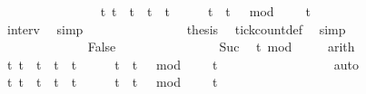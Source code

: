\begin{isabellebody}
\ \ \ \ \ \ \ \ \ \ \ \ \ \ \isamarkupfalse%
\ {\isacartoucheopen}{\isacharbraceleft}t{\isachardot}\ t\ {\isasymle}\ t\ {\isasymand}\ t\ {\isacharless}\ t\ {\isacharplus}\ {}\ {\isasymand}\ {}\ {\isasymle}\ t\ {\isasymand}\ {\isacharparenleft}t\ {\isacharminus}\ {}{\isacharparenright}\ mod\ {}\ {\isacharequal}\ {}{\isacharbraceright}\ {\isacharequal}\ {\isacharbraceleft}t\isanewline
\ \ \ \ \ \ \ \ \ \ \ \ \ \ \ \ \isamarkupfalse%
\ interv{\isacharunderscore}{}\ \isamarkupfalse%
\ simp\isanewline
\ \ \ \ \ \ \ \ \ \ \ \ \ \ \isamarkupfalse%
\ {\isacharquery}thesis\ \isamarkupfalse%
\ tick{\isacharunderscore}count{\isacharunderscore}def\ \isamarkupfalse%
\ simp\isanewline
\ \ \ \ \ \ \ \ \ \ \isamarkupfalse%
\isanewline
\ \ \ \ \ \ \ \ \ \ \ \ \isamarkupfalse%
\ False\isanewline
\ \ \ \ \ \ \ \ \ \ \ \ \ \ \isamarkupfalse%
\ Suc\ \isamarkupfalse%
\ {\isacartoucheopen}t\ mod\ {}\ {\isacharequal}\ {}{\isacartoucheclose}\ \isamarkupfalse%
\ arith\isanewline
\ \ \ \ \ \ \ \ \ \ \ \ \ \ \isamarkupfalse%
\ {\isacartoucheopen}{\isacharbraceleft}t{\isachardot}\ {\isacharparenleft}t\ {\isacharequal}\ t\ {\isasymor}\ t\ {\isacharequal}\ t\ {\isacharplus}\ {}{\isacharparenright}\ {\isasymand}\ {}\ {\isasymle}\ t\ {\isasymand}\ {\isacharparenleft}t\ {\isacharminus}\ {}{\isacharparenright}\ mod\ {}\ {\isacharequal}\ {}{\isacharbraceright}\ {\isacharequal}\ {\isacharbraceleft}t\isanewline
\ \ \ \ \ \ \ \ \ \ \ \ \ \ \ \ \isamarkupfalse%
\ auto\ \isanewline
\ \ \ \ \ \ \ \ \ \ \ \ \ \ \isamarkupfalse%
\ {\isacartoucheopen}{\isacharbraceleft}t{\isachardot}\ t\ {\isasymle}\ t\ {\isasymand}\ t\ {\isacharless}\ t\ {\isacharplus}\ {}\ {\isasymand}\ {}\ {\isasymle}\ t\ {\isasymand}\ {\isacharparenleft}t\ {\isacharminus}\ {}{\isacharparenright}\ mod\ {}\ {\isacharequal}\ {}{\isacharbraceright}\ {\isacharequal}\ {\isacharbraceleft}t\isanewline

\end{isabellebody}
